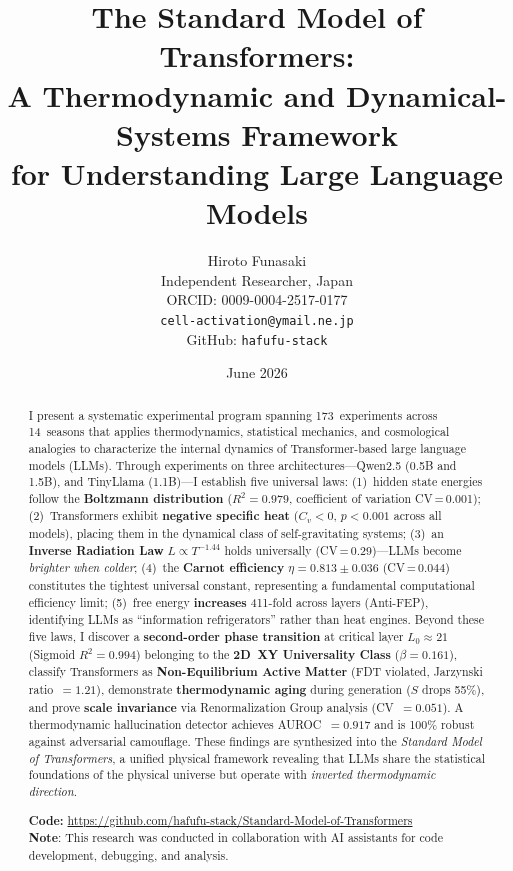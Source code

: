 \documentclass[11pt,a4paper]{article}
\title{The Standard Model of Transformers:\\
A Thermodynamic and Dynamical-Systems Framework\\for Understanding Large Language Models}
\author{Hiroto Funasaki\\
Independent Researcher, Japan\\
ORCID: 0009-0004-2517-0177\\
\texttt{cell-activation@ymail.ne.jp}\\
GitHub: \texttt{hafufu-stack}
}
\date{June 2026}
\begin{document}
\maketitle

\begin{abstract}
I present a systematic experimental program spanning 173~experiments across 14~seasons that applies thermodynamics, statistical mechanics, and cosmological analogies to characterize the internal dynamics of Transformer-based large language models (LLMs). Through experiments on three architectures---Qwen2.5 (0.5B and 1.5B), and TinyLlama (1.1B)---I establish five universal laws:
(1)~hidden state energies follow the \textbf{Boltzmann distribution} ($R^2 = 0.979$, coefficient of variation CV\,=\,0.001);
(2)~Transformers exhibit \textbf{negative specific heat} ($C_v < 0$, $p < 0.001$ across all models), placing them in the dynamical class of self-gravitating systems;
(3)~an \textbf{Inverse Radiation Law} $L \propto T^{-1.44}$ holds universally (CV\,=\,0.29)---LLMs become \emph{brighter when colder};
(4)~the \textbf{Carnot efficiency} $\eta = 0.813 \pm 0.036$ (CV\,=\,0.044) constitutes the tightest universal constant, representing a fundamental computational efficiency limit;
(5)~free energy \textbf{increases} 411-fold across layers (Anti-FEP), identifying LLMs as ``information refrigerators'' rather than heat engines.
Beyond these five laws, I discover a \textbf{second-order phase transition} at critical layer $L_0 \approx 21$ (Sigmoid $R^2 = 0.994$) belonging to the \textbf{2D~XY Universality Class} ($\beta = 0.161$), classify Transformers as \textbf{Non-Equilibrium Active Matter} (FDT violated, Jarzynski ratio~$= 1.21$), demonstrate \textbf{thermodynamic aging} during generation ($S$ drops 55\%), and prove \textbf{scale invariance} via Renormalization Group analysis (CV~$= 0.051$). A thermodynamic hallucination detector achieves AUROC~$= 0.917$ and is 100\% robust against adversarial camouflage.
These findings are synthesized into the \textit{Standard Model of Transformers}, a unified physical framework revealing that LLMs share the statistical foundations of the physical universe but operate with \emph{inverted thermodynamic direction}.

\medskip
\noindent\textbf{Code:} \url{https://github.com/hafufu-stack/Standard-Model-of-Transformers}\\
\textbf{Note}: This research was conducted in collaboration with AI assistants for code development, debugging, and analysis.
\end{abstract}
\end{document}

